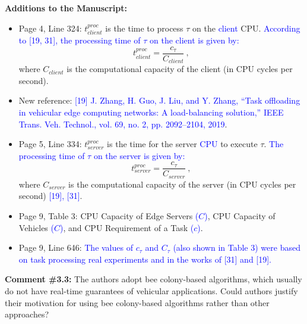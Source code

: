 \textbf{Additions to the Manuscript:}

\begin{itemize}
    \item Page 4, Line 324: $t^{proc}_{client}$ is the time to process $\tau$ on the \textcolor{blue}{client} CPU. \textcolor{blue}{According to [19, 31], the processing time of $\tau$ on the client is given by:}
    \begin{equation}    
    t^{proc}_{client} = \frac{c_{\tau}}{C_{client}}~,
    \end{equation} 
    where $C_{client}$ is the computational capacity of the client (in CPU cycles per second).
    \item New reference: \textcolor{blue}{[19] J. Zhang, H. Guo, J. Liu, and Y. Zhang, “Task offloading in vehicular edge computing networks: A load-balancing solution,” IEEE Trans. Veh. Technol., vol. 69, no. 2, pp. 2092–2104, 2019}.
    \item Page 5, Line 334: $t^{proc}_{server}$ is the time for the server \textcolor{blue}{CPU} to execute $\tau$. \textcolor{blue}{The processing time of $\tau$ on the server is given by:}    
    \begin{equation}    
    t^{proc}_{server} = \frac{c_{\tau}}{C_{server}}~,
    \end{equation}    
    where $C_{server}$ is the computational capacity of the server (in CPU cycles per second) \textcolor{blue}{[19], [31]}.
    \item Page 9, Table 3: CPU Capacity of Edge Servers \textcolor{blue}{($C$)}, CPU Capacity of Vehicles \textcolor{blue}{($C$)}, and CPU Requirement of a Task \textcolor{blue}{($c$)}.
    \item Page 9, Line 646: \textcolor{blue}{The values of $c_{\tau}$ and $C_{\tau}$ (also shown in Table 3) were based on task processing real experiments and in the works of [31] and [19].}
\end{itemize}

\vspace{\baselineskip}

\begin{mdframed}[style=review] 
\textbf{Comment \#3.3:} The authors adopt bee colony-based algorithms, which usually do not have real-time guarantees of vehicular applications. Could authors justify their motivation for using bee colony-based algorithms rather than other approaches?
\end{mdframed}

